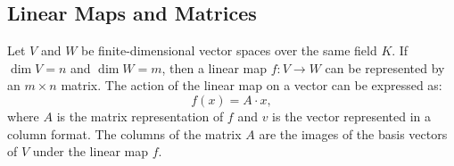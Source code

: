 \subsection{Linear Maps and Matrices}
 Let \( V \) and \( W \) be finite-dimensional vector spaces over the same field \( K \). If \( \dim V = n \) and \( \dim W = m \), then a linear map \( f: V \to W \) can be represented by an \( m \times n \) matrix. The action of the linear map on a vector can be expressed as:
\[
f(x) = A \cdot x,
\]
where \( A \) is the matrix representation of \( f \) and \( v \) is the vector represented in a column format. The columns of the matrix \( A \) are the images of the basis vectors of \( V \) under the linear map \( f \).


